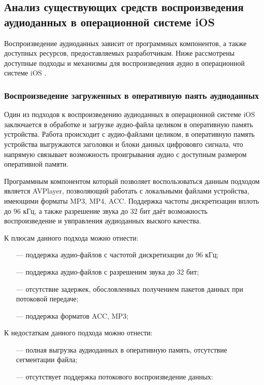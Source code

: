 \subsection{Анализ существующих средств воспроизведения аудиоданных в операционной системе iOS}
	
	Воспроизведение аудиоданных зависит от программных компонентов, а также доступных ресурсов, предоставляемых разработчикам.
	Ниже рассмотрены доступные подходы и механизмы для воспроизведения аудио в операционной системе iOS \cite{iOSOS}.

	\subsubsection{Воспроизведение загруженных в оперативную паять аудиоданных}
		\par Один из подходов к воспроизведению аудиоданных в операционной системе iOS заключается в обработке и загрузке аудио-файла целиком в оперативную память устройства.
		Работа происходит с аудио-файлами целиком, в оперативную память устройства выгружаются заголовки и блоки данных цифрововго сигнала, 
		что напрямую связывает возможность проигрывания аудио с доступным размером оперативной памяти. 
		
		\par Программным компонентом который позволяет воспользоваться данным подходом является AVPlayer, позволяющий работать с локальными файлами устройства, имеющими форматы MP3, MP4, ACC.
		Поддержка частоты дискретизации вплоть до 96 кГц, а также разрешение звука до 32 бит даёт возможность воспроизведение и увправления
		аудиоданных выского качества.

		\par К плюсам данного подхода можно отнести:
		\begin{itemize}
			\item[---] поддержка аудио-файлов с частотой дискретизации до 96 кГц;
			\item[---] поддержка аудио-файлов с разрешеним звука до 32 бит;
			\item[---] отсутствие задержек, обословленных получением пакетов данных при потоковой передаче;
			\item[---] поддержка форматов ACC, MP3; 
		\end{itemize}

		\par К недостаткам данного подхода можно отнести:
		\begin{itemize}
			\item[---] полная выгрузка аудиоданных в оперативную память, отсутствие сегментации файла;
			\item[---] отсутствует поддержка потокового воспроизведение данных:
		\end{itemize}


